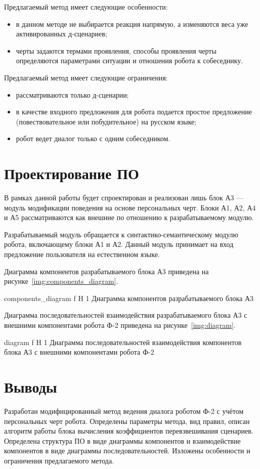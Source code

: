 Предлагаемый метод имеет следующие особенности:

\begin{itemize}
	\item в данном методе не выбирается реакция напрямую, а изменяются веса уже активированных д-сценариев;
	\item черты задаются термами проявления, способы проявления черты определяются параметрами ситуации и отношения робота к собеседнику.
\end{itemize}

Предлагаемый метод имеет следующие ограничения:

\begin{itemize}
	\item рассматриваются только д-сценарии;
	\item в качестве входного предложения для робота подается простое предложение (повествовательное или побудительное) на русском языке;
	\item робот ведет диалог только с одним собеседником.
\end{itemize}

\section{Проектирование ПО}

В рамках данной работы будет спроектирован и реализован лишь блок А3 ---
модуль модификации поведения на основе персональных черт.
Блоки А1, А2, А4
и А5 рассматриваются как внешние по отношению к разрабатываемому модулю.

Разрабатываемый модуль обращается к синтактико-семантическому модулю
робота, включающему блоки А1 и А2.
Данный модуль принимает на вход предложение
пользователя на естественном языке.

Диаграмма компонентов разрабатываемого блока А3 приведена на
рисунке~\ref{img:components_diagram}.

{components_diagram}
{f}
{H}
{1\textwidth}
{Диаграмма компонентов разрабатываемого блока А3}

Диаграмма последовательностей взаимодействия разрабатываемого блока А3 с
внешними компонентами робота Ф-2 приведена на рисунке~\ref{img:diagram}.

{diagram}
{f}
{H}
{1\textwidth}
{Диаграмма последовательностей взаимодействия компонентов блока А3 с внешними компонентами робота Ф-2}


\section*{Выводы}

Разработан модифицированный метод ведения диалога роботом Ф-2 с учётом персональных черт робота.
Определены параметры метода, вид правил, описан алгоритм работы блока вычисления коэффициентов перевзвешивания сценариев.
Определена структура ПО в виде диаграммы компонентов и взаимодействие компонентов в виде диаграммы последовательностей.
Изложены особенности и ограничения предлагаемого метода.
